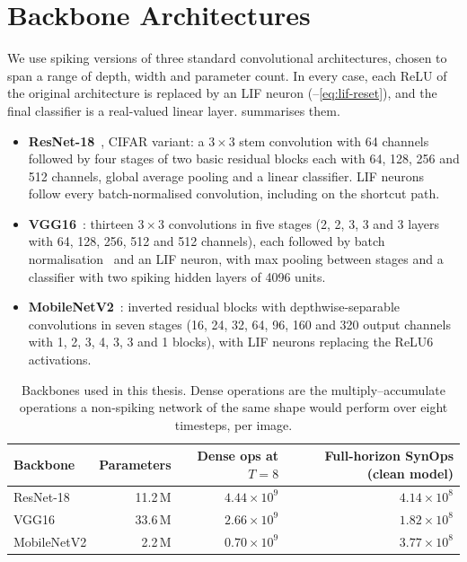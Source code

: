 \section{Backbone Architectures}
\label{sec:meth-models}

We use spiking versions of three standard convolutional architectures, chosen to span a range of depth, width and parameter count. In every case, each ReLU of the original architecture is replaced by an LIF neuron (--\eqref{eq:lif-reset}), and the final classifier is a real-valued linear layer.  summarises them.

\begin{itemize}
    \item \textbf{ResNet-18}~\cite{he2016deep}, CIFAR variant: a $3\times3$ stem convolution with 64 channels followed by four stages of two basic residual blocks each with 64, 128, 256 and 512 channels, global average pooling and a linear classifier. LIF neurons follow every batch-normalised convolution, including on the shortcut path.
    \item \textbf{VGG16}~\cite{simonyan2015very}: thirteen $3\times3$ convolutions in five stages (2, 2, 3, 3 and 3 layers with 64, 128, 256, 512 and 512 channels), each followed by batch normalisation~\cite{ioffe2015batch} and an LIF neuron, with max pooling between stages and a classifier with two spiking hidden layers of 4096 units.
    \item \textbf{MobileNetV2}~\cite{sandler2018mobilenetv2}: inverted residual blocks with depthwise-separable convolutions in seven stages (16, 24, 32, 64, 96, 160 and 320 output channels with 1, 2, 3, 4, 3, 3 and 1 blocks), with LIF neurons replacing the ReLU6 activations.
\end{itemize}

\begin{table}[htbp]
    \centering
    \caption{Backbones used in this thesis. Dense operations are the multiply--accumulate operations a non-spiking network of the same shape would perform over eight timesteps, per image.}
    \label{tab:backbones}
    \small
    \begin{tabular}{@{}l r r r@{}}
        \toprule
        Backbone & Parameters & Dense ops at $T=8$ & Full-horizon SynOps (clean model) \\
        \midrule
        ResNet-18   & 11.2\,M & $4.44 \times 10^{9}$ & $4.14 \times 10^{8}$ \\
        VGG16       & 33.6\,M & $2.66 \times 10^{9}$ & $1.82 \times 10^{8}$ \\
        MobileNetV2 & 2.2\,M  & $0.70 \times 10^{9}$ & $3.77 \times 10^{8}$ \\
        \bottomrule
    \end{tabular}
\end{table}

